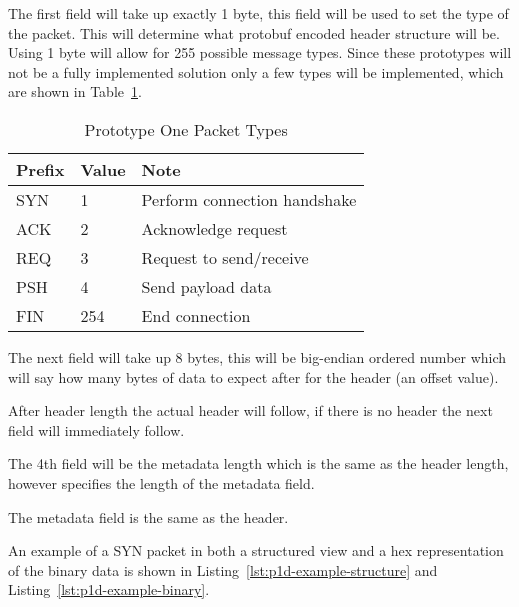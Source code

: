 The first field will take up exactly 1 byte, this field will be used to set the type of the packet. This will determine what protobuf encoded header structure will be. Using 1 byte will allow for 255 possible message types. Since these prototypes will not be a fully implemented solution only a few types will be implemented, which are shown in Table~\ref{tab:p1d-packet-types}.

\begin{table}[h!]
    \caption{Prototype One Packet Types}
    \label{tab:p1d-packet-types}
    \centering
    \begin{tabular}{ l l l }
        \hline
        \textbf{Prefix} & \textbf{Value} & \textbf{Note}                \\
        \hline
        SYN             & 1              & Perform connection handshake \\
        \hline
        ACK             & 2              & Acknowledge request          \\
        \hline
        REQ             & 3              & Request to send/receive      \\
        \hline
        PSH             & 4              & Send payload data            \\
        \hline
        FIN             & 254            & End connection               \\
        \hline
    \end{tabular}
\end{table}

The next field will take up 8 bytes, this will be big-endian ordered number which will say how many bytes of data to expect after for the header (an offset value).

After header length the actual header will follow, if there is no header the next field will immediately follow.

The 4th field will be the metadata length which is the same as the header length, however specifies the length of the metadata field.

The metadata field is the same as the header.

An example of a SYN packet in both a structured view and a hex representation of the binary data is shown in Listing~\ref{lst:p1d-example-structure} and Listing~\ref{lst:p1d-example-binary}.

